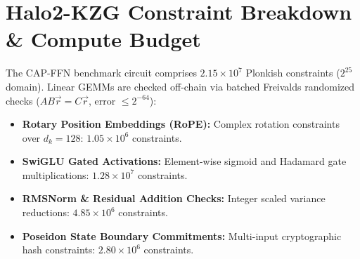 \documentclass[10pt,twocolumn,letterpaper]{article}
\begin{document}
\section{Halo2-KZG Constraint Breakdown \& Compute Budget}
The CAP-FFN benchmark circuit comprises $2.15 \times 10^7$ Plonkish constraints ($2^{25}$ domain). Linear GEMMs are checked off-chain via batched Freivalds randomized checks ($AB\vec{r} = C\vec{r}$, error $\le 2^{-64}$):
\begin{itemize}
    \item \textbf{Rotary Position Embeddings (RoPE):} Complex rotation constraints over $d_k = 128$: $1.05 \times 10^6$ constraints.
    \item \textbf{SwiGLU Gated Activations:} Element-wise sigmoid and Hadamard gate multiplications: $1.28 \times 10^7$ constraints.
    \item \textbf{RMSNorm \& Residual Addition Checks:} Integer scaled variance reductions: $4.85 \times 10^6$ constraints.
    \item \textbf{Poseidon State Boundary Commitments:} Multi-input cryptographic hash constraints: $2.80 \times 10^6$ constraints.
\end{itemize}
\end{document}
